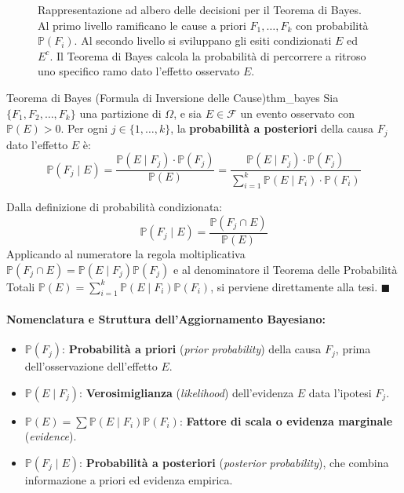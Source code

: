 \begin{figure}[htbp]
\centering

\caption{Rappresentazione ad albero delle decisioni per il Teorema di Bayes. Al primo livello ramificano le cause a priori $F_1, \dots, F_k$ con probabilità $\mathbb{P}(F_i)$. Al secondo livello si sviluppano gli esiti condizionati $E$ ed $E^c$. Il Teorema di Bayes calcola la probabilità di percorrere a ritroso uno specifico ramo dato l'effetto osservato $E$.}
\label{fig:albero_bayes}
\end{figure}

\begin{teorema}{Teorema di Bayes (Formula di Inversione delle Cause)}{thm_bayes}
Sia $\{F_1, F_2, \dots, F_k\}$ una partizione di $\Omega$, e sia $E \in \mathcal{F}$ un evento osservato con $\mathbb{P}(E) > 0$. Per ogni $j \in \{1, \dots, k\}$, la \textbf{probabilità a posteriori} della causa $F_j$ dato l'effetto $E$ è:
\begin{equation}
    \mathbb{P}(F_j \mid E) = \frac{\mathbb{P}(E \mid F_j) \cdot \mathbb{P}(F_j)}{\mathbb{P}(E)} = \frac{\mathbb{P}(E \mid F_j) \cdot \mathbb{P}(F_j)}{\sum_{i=1}^k \mathbb{P}(E \mid F_i) \cdot \mathbb{P}(F_i)}
\end{equation}
\end{teorema}

\begin{dimostrazione}
Dalla definizione di probabilità condizionata:
\begin{equation}
    \mathbb{P}(F_j \mid E) = \frac{\mathbb{P}(F_j \cap E)}{\mathbb{P}(E)}
\end{equation}
Applicando al numeratore la regola moltiplicativa $\mathbb{P}(F_j \cap E) = \mathbb{P}(E \mid F_j)\mathbb{P}(F_j)$ e al denominatore il Teorema delle Probabilità Totali $\mathbb{P}(E) = \sum_{i=1}^k \mathbb{P}(E \mid F_i)\mathbb{P}(F_i)$, si perviene direttamente alla tesi. $\blacksquare$
\end{dimostrazione}

\paragraph{Nomenclatura e Struttura dell'Aggiornamento Bayesiano:}
\begin{itemize}
    \item $\mathbb{P}(F_j)$: \textbf{Probabilità a priori} (\emph{prior probability}) della causa $F_j$, prima dell'osservazione dell'effetto $E$.
    \item $\mathbb{P}(E \mid F_j)$: \textbf{Verosimiglianza} (\emph{likelihood}) dell'evidenza $E$ data l'ipotesi $F_j$.
    \item $\mathbb{P}(E) = \sum \mathbb{P}(E \mid F_i)\mathbb{P}(F_i)$: \textbf{Fattore di scala o evidenza marginale} (\emph{evidence}).
    \item $\mathbb{P}(F_j \mid E)$: \textbf{Probabilità a posteriori} (\emph{posterior probability}), che combina informazione a priori ed evidenza empirica.
\end{itemize}

